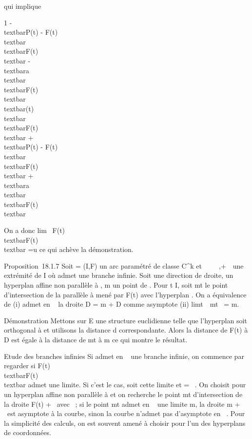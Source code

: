 qui implique

1 - \\textbar{}P(t) - F(t)\\textbar{}
\over
\\textbar{}F(t)\\textbar{} -
\\textbar{}a\\textbar{}
\over
\\textbar{}F(t)\\textbar{} \leq
\\textbar{}\overrightarrowaP(t)\\textbar{}
\over
\\textbar{}F(t)\\textbar{}  +
\\textbar{}P(t) - F(t)\\textbar{}
\over
\\textbar{}F(t)\\textbar{} +
\\textbar{}a\\textbar{}
\over
\\textbar{}F(t)\\textbar{}

On a donc lim~ F(t) \over
\\textbar{}F(t)\\textbar{}
=\vec u ce qui achève la démonstration.

Proposition~18.1.7 Soit \Gamma = (I,F) un arc paramétré de classe
C^k et \alpha~ \in {}~ \cup\-\infty~,+\infty~\ une
extrémité de I où \Gamma admet une branche infinie. Soit
\vecD une direction de droite, \Pi un hyperplan affine
non parallèle à \vecD, m un point de \Pi. Pour t \in I,
soit mt le point d'intersection de la parallèle à
\vecD mené par F(t) avec l'hyperplan \Pi. On a
équivalence de (i) \Gamma admet en \alpha~ la droite D = m +\vec
D comme asymptote (ii)
limt\rightarrow~\alpha~mt~ = m.

Démonstration Mettons sur E une structure euclidienne telle que
l'hyperplan \Pi soit orthogonal à \vecD et utilisons la
distance d correspondante. Alors la distance de F(t) à D est égale à la
distance de mt à m ce qui montre le résultat.

Etude des branches infinies Si \Gamma admet en \alpha~ une branche infinie, on
commence par regarder si  F(t) \over
\\textbar{}F(t)\\textbar{} admet une
limite. Si c'est le cas, soit \vecu cette limite et
\vecD = ~\vecu. On choisit pour \Pi
un hyperplan affine non parallèle à \vecD et on
recherche le point mt d'intersection de la droite F(t) +
~\vecu avec \Pi~; si le point mt admet en \alpha~
une limite m, la droite m + ~\vecu est asymptote à la
courbe, sinon la courbe n'admet pas d'asymptote en \alpha~. Pour la simplicité
des calculs, on est souvent amené à choisir pour \Pi l'un des hyperplans
de coordonnées.

